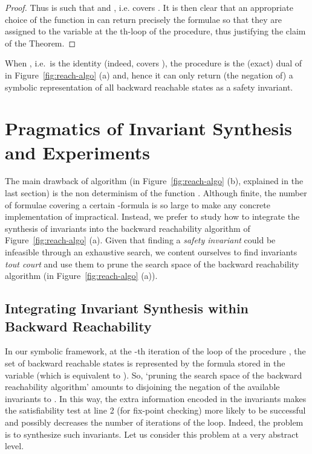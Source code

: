 \documentclass{LMCS}
\theoremstyle{plain}\newtheorem{assumption}[thm]{Assumption}
\theoremstyle{plain}\newtheorem{proposition}[thm]{Proposition}
\theoremstyle{plain}\newtheorem{property}[thm]{Property}
\theoremstyle{plain}\newtheorem{example}[thm]{Example}
\theoremstyle{plain}\newtheorem{claim}[thm]{Claim}
\theoremstyle{plain}\newtheorem{lemma}[thm]{Lemma}
\begin{document}
\begin{proof}
  Thus  is such that  and , i.e.  covers .
It is then clear that an appropriate choice of the function
   in  can return precisely the
  formulae  so that they are assigned to the variable  at the
  th-loop of the procedure, thus justifying the claim of the
  Theorem.
\end{proof}
When , i.e.\  is the
identity (indeed,  covers ), the procedure  is
the (exact) dual of  in Figure~\ref{fig:reach-algo}
(a) and, hence it can only return (the negation of) a symbolic
representation of all backward reachable states as a safety invariant.


\section{Pragmatics of Invariant Synthesis and Experiments}
\label{sec:implementation}


The main drawback of algorithm  (in
Figure~\ref{fig:reach-algo} (b), explained in the last section) is the
non determinism of the function .  Although
finite, the number of formulae covering a certain -formula
is so large to make any concrete implementation of 
impractical.  Instead, we prefer to study how to integrate the
synthesis of invariants into the backward reachability algorithm of
Figure~\ref{fig:reach-algo} (a). Given that finding a \emph{safety
  invariant} could be infeasible through an exhaustive search, we
content ourselves to find invariants \emph{tout court} and use them to
prune the search space of the backward reachability algorithm
 (in Figure~\ref{fig:reach-algo} (a)).

\subsection{Integrating Invariant Synthesis within Backward
  Reachability}
\label{sec:back+inv}

In our symbolic framework, at the -th iteration of the loop of the
procedure , the set of backward reachable states is
represented by the formula stored in the variable  (which is
equivalent to ).  So, `pruning the search space of the
backward reachability algorithm' amounts to disjoining the negation of
the available invariants to .  In this way, the extra information
encoded in the invariants makes the satisfiability test at line 2 (for
fix-point checking) more likely to be successful and possibly
decreases the number of iterations of the loop.  Indeed, the problem
is to synthesize such invariants. Let us consider
this problem at a very abstract level.
\end{document}
